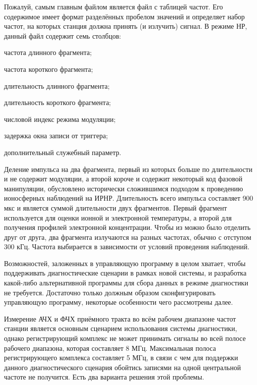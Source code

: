\documentclass{report}
\begin{document}
Пожалуй, самым главным файлом является файл с таблицей частот. Его содержимое имеет формат разделённых пробелом значений и определяет набор частот, на которых станция должна принять (и излучить) сигнал. В режиме НР, данный файл содержит семь столбцов:

\begin{enummarker}
    \item частота длинного фрагмента;
    \item частота короткого фрагмента;
    \item длительность длинного фрагмента;
    \item длительность короткого фрагмента;
    \item числовой индекс режима модуляции;
    \item задержка окна записи от триггера;
    \item дополнительный служебный параметр.
\end{enummarker}

Деление импульса на два фрагмента, первый из которых больше по длительности и не содержит модуляции, а второй короче и содержит некоторый код фазовой манипуляции, обусловлено исторически сложившимся подходом к проведению ионосферных наблюдений на ИРНР. Длительность всего импульса составляет 900 мкс и является суммой длительности двух фрагментов. Первый фрагмент используется для оценки ионной и электронной температуры, а второй для получения профилей электронной концентрации. Чтобы из можно было отделить друг от друга, два фрагмента излучаются на разных частотах, обычно с отступом 300 кГц. Частота выбирается в зависимости от условий проведения наблюдений.

Возможностей, заложенных в управляющую программу в целом хватает, чтобы поддерживать диагностические сценарии в рамках новой системы, и разработка какой-либо альтернативной программы для сбора данных в режиме диагностики не требуется. Достаточно только должным образом сконфигурировать управляющую программу, некоторые особенности чего рассмотрены далее.

Измерение АЧХ и ФЧХ приёмного тракта во всём рабочем диапазоне частот станции является основным сценарием использования системы диагностики, однако регистрирующий комплекс не может принимать сигналы во всей полосе рабочего диапазона, которая составляет 8 МГц. Максимальная полоса регистрирующего комплекса составляет 5 МГц, в связи с чем для поддержки данного диагностического сценария обойтись записями на одной центральной частоте не получится. Есть два варианта решения этой проблемы.
\end{document}
